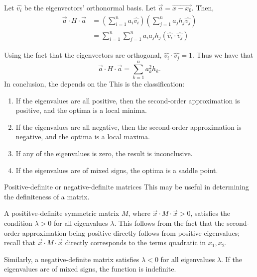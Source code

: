 \documentclass[a4paper, 12pt,oneside,openany]{book}
\begin{document}
Let $\hat{v_i}$ be the eigenvectors' orthonormal basis. Let $\vec{a}=\overrightarrow{x-x_0}$. Then, \begin{align*} \vec{a} \cdot H \cdot \vec{a} &= (\sum\limits_{i=1}^n a_i \hat{v_i})(\sum\limits_{j=1}^n a_j h_j \hat{v_j})\\ &= \sum\limits_{i=1}^n\sum\limits_{j=1}^n a_i a_j h_j (\hat{v_i} \cdot \hat{v_j}) \end{align*}

Using the fact that the eigenvectors are orthogonal, $\hat{v_i} \cdot \hat{v_j}=1.$ Thus we have that $$\vec{a} \cdot H \cdot \vec{a} = \sum\limits_{k=1}^n a_k^2 h_k.$$ In conclusion, the  depends on the  This is the classification:

\begin{enumerate}
	\item If the eigenvalues are all positive, then the second-order approximation is positive, and the optima is a local minima. 
	\item If the eigenvalues are all negative, then the second-order approximation is negative, and the optima is a local maxima.
	\item If any of the eigenvalues is zero, the result is inconclusive.
	\item If the eigenvalues are of mixed signs, the optima is a saddle point.
\end{enumerate}

 Positive-definite or negative-definite matrices  This may be useful in determining the definiteness of a matrix.

 A posititve-definite symmetric matrix $M$, where $\vec{x} \cdot M \cdot \vec{x}>0$, satisfies the condition $\lambda>0$ for all eigenvalues $\lambda$. This follows from the fact that the second-order approximation being positive directly follows from positive eigenvalues; recall that $\vec{x} \cdot M \cdot \vec{x}$ directly corresponds to the terms quadratic in $x_1, x_2$.

Similarly, a negative-definite matrix satisfies $\lambda<0$ for all eigenvalues $\lambda$. If the eigenvalues are of mixed signs, the function is indefinite.
\end{document}

